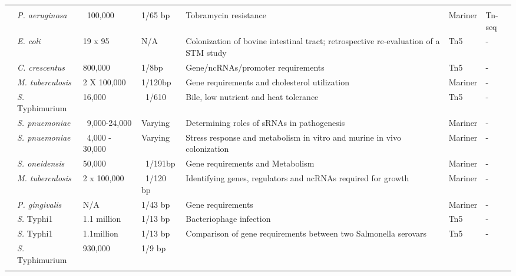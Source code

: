 \begin{landscape}
\begin{longtable}{ l
    				l
				l
				l
				p{2in}
				l
				l}
          &       &       &  &       &       &  \\
    \multirow{2}[0]{*}{\textcite{Gallagher2011}}  & \multirow{2}[0]{*}{\textit{P. aeruginosa}} & \multirow{2}[0]{*}{~100,000} & \multirow{2}[0]{*}{1/65 bp} & \multirow{2}[0]{2in}{Tobramycin resistance} & \multirow{2}[0]{*}{Mariner} & \multirow{2}[0]{*}{Tn-seq} \\
          &       &       &       &       &       & (circle method)  \\
    \textcite{Eckert2011}  & \textit{E. coli} & 19 x 95 & N/A & Colonization of bovine intestinal tract; retrospective re-evaluation of a STM study & Tn5   & - \\
    \textcite{Christen2011}  & \textit{C. crescentus} & 800,000 & 1/8bp & Gene/ncRNAs/promoter requirements & Tn5   & - \\
    \textcite{Griffin2011}  & \textit{M. tuberculosis} & 2 X 100,000 & 1/120bp & Gene requirements and cholesterol utilization & Mariner & - \\
    \textcite{Khatiwara2012}  & {\it S.} Typhimurium & 16,000 & ~1/610 & Bile, low nutrient and heat tolerance & Tn5   & - \\
    \textcite{Mann2012}  & \textit{S. pnuemoniae} & ~9,000-24,000 & Varying & Determining roles of sRNAs in pathogenesis & Mariner & - \\
    \textcite{Opijnen2012}  & \textit{S. pnuemoniae} & ~4,000 - 30,000 & Varying & Stress response and metabolism in vitro and murine in vivo colonization & Mariner & - \\
    \textcite{Brutinel2012} & \textit{S. oneidensis} & 50,000 &  ~1/191bp & Gene requirements and Metabolism & Mariner & - \\
    \textcite{Zhang2012} & \textit{M. tuberculosis} & 2 x 100,000 &  ~1/120 bp & Identifying genes, regulators and ncRNAs required for growth & Mariner & - \\
    \textcite{Klein2012}  & \textit{P. gingivalis} & N/A   & 1/43 bp & Gene requirements & Mariner & - \\
    \textcite{Pickard2013}  & {\it S.} Typhi1 & 1.1 million & 1/13 bp & Bacteriophage infection & Tn5   & - \\
    \multirow{2}[1]{*}{\textcite{Barquist2013a}}  & {\it S.} Typhi1 & 1.1million & 1/13 bp & \multirow{2}[1]{2in}{Comparison of gene requirements between two Salmonella serovars} & \multirow{2}[1]{*}{Tn5} & \multirow{2}[1]{*}{-} \\
          & {\it S.} Typhimurium & 930,000 & 1/9 bp &       &       &  \\
    \bottomrule
    \label{tab:studies}%
    \end{longtable}%
\end{landscape}%
\endgroup

